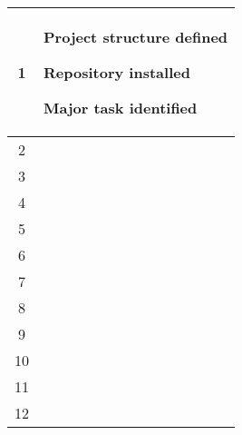 \begin{center}
\begin{longtable}{|c|p{12cm}|}
1 & 
\begin{journal}
	\item Project structure defined
	\item Repository installed
	\item Major task identified
\end{journal}
\\ \hline
2 & 
\begin{journal}
	\item 
\end{journal}
\\ \hline
3 & 
\begin{journal}
	\item 
\end{journal}
\\ \hline
4 & 
\begin{journal}
	\item 
\end{journal}
\\ \hline
5 & 
\begin{journal}
	\item 
\end{journal}
\\ \hline
6 & 
\begin{journal}
	\item 
\end{journal}
\\ \hline
7 & 
\begin{journal}
	\item 
\end{journal}
\\ \hline
8 & 
\begin{journal}
	\item 
\end{journal}
\\ \hline
9 & 
\begin{journal}
	\item 
\end{journal}
\\ \hline
10 & 
\begin{journal}
	\item 
\end{journal}
\\ \hline
11 & 
\begin{journal}
	\item 
\end{journal}
\\ \hline
12 & 
\begin{journal}
	\item 

\end{journal}
\end{longtable}
\end{center}
